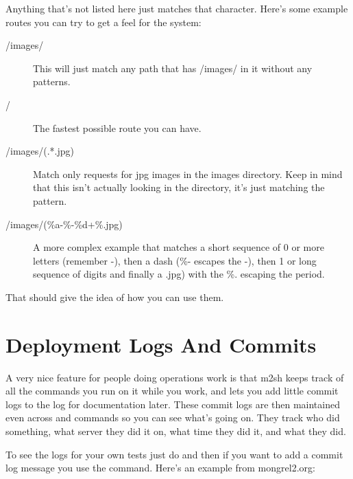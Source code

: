 Anything that's not listed here just matches that character.  Here's some example routes you can try to get
a feel for the system:

\begin{description}
\item [/images/]  This will just match any path that has /images/ in it without any patterns.
\item [/] The fastest possible route you can have.
\item [/images/(.*.jpg)] Match only requests for jpg images in the images directory.  Keep in mind that this
    isn't actually looking in the directory, it's just matching the  pattern.
\item [/images/(\%a-\%-\%d+\%.jpg)] A more complex example that matches a short sequence of 0 or more letters (remember -), then a dash
    (\%- escapes the -), then 1 or long sequence of digits and finally a .jpg) with the \%. escaping the period.
\end{description}

That should give the idea of how you can use them.


\section{Deployment Logs And Commits}

A very nice feature for people doing operations work is that m2sh keeps track of all the
commands you run on it while you work, and lets you add little commit logs to the 
log for documentation later.  These commit logs are then maintained even across 
 and  commands so you can see what's going on.  They 
track who did something, what server they did it on, what time they did it, and what they
did.

To see the logs for your own tests just do  and then
if you want to add a commit log message you use the  command.
Here's an example from mongrel2.org:

